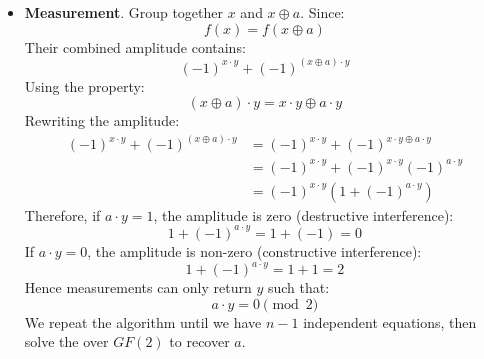 \begin{itemize}
    \item \textbf{Measurement}. Group together $x$ and $x \oplus a$. Since:
        \begin{equation*}
            f(x) = f(x \oplus a)
        \end{equation*}
        Their combined amplitude contains:
        \begin{equation*}
            (-1)^{x \cdot y} + (-1)^{(x \oplus a) \cdot y}
        \end{equation*}
        Using the property:
        \begin{equation*}
            (x \oplus a) \cdot y = x \cdot y \oplus a \cdot y
        \end{equation*}
        Rewriting the amplitude:
        \begin{align*}
            (-1)^{x \cdot y} + (-1)^{(x \oplus a) \cdot y} &= (-1)^{x \cdot y} + (-1)^{x \cdot y \oplus a \cdot y} \\
            &= (-1)^{x \cdot y} + (-1)^{x \cdot y} (-1)^{a \cdot y} \\
            &= (-1)^{x \cdot y} \left(1 + (-1)^{a \cdot y}\right)
        \end{align*}
        Therefore, if $a \cdot y = 1$, the amplitude is zero (destructive interference):
        \begin{equation*}
            1 + (-1)^{a \cdot y} = 1 + (-1) = 0
        \end{equation*}
        If $a \cdot y = 0$, the amplitude is non-zero (constructive interference):
        \begin{equation*}
            1 + (-1)^{a \cdot y} = 1 + 1 = 2
        \end{equation*}
        Hence measurements can only return $y$ such that:
        \begin{equation*}
            a \cdot y = 0 \pmod 2
        \end{equation*}
        We repeat the algorithm until we have $n-1$ independent equations, then solve the over $GF(2)$ to recover $a$.
\end{itemize}

